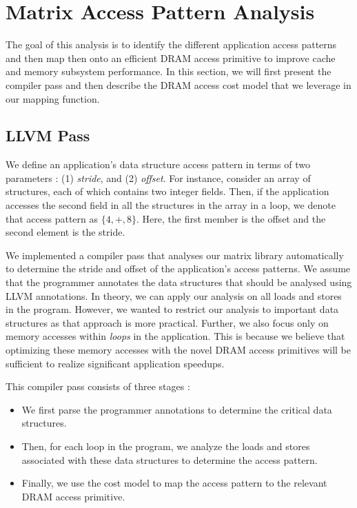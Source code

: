 \documentclass[letterpaper]{article}
\begin{document}
\section{Matrix Access Pattern Analysis}

The goal of this analysis is to identify the different application access
patterns and then map then onto an efficient DRAM access primitive to improve
cache and memory subsystem performance. In this section, we will first present
the compiler pass and then describe the DRAM access cost model that we leverage
in our mapping function.

\subsection{LLVM Pass}

We define an application's data structure access pattern in terms of two 
parameters : (1) \textit{stride}, and (2) \textit{offset}. 
For instance, consider an array of structures, each of which contains two
integer fields. 
Then, if the application accesses the second field in all the structures 
in the array in a loop, we denote that access pattern as $\{4,+,8\}$. 
Here, the first member is the offset and the second element is the stride.

We implemented a compiler pass that analyses our matrix library automatically
to determine the stride and offset of the application's access patterns.
We assume that the programmer annotates the data structures that should
be analysed using LLVM annotations.
In theory, we can apply our analysis on all loads and stores in the program.
However, we wanted to restrict our analysis to important data structures
as that approach is more practical.
Further, we also focus only on memory accesses within \textit{loops} in the 
application. This is because we believe that optimizing these memory accesses
with the novel DRAM access primitives will be sufficient to realize
significant application speedups.

This compiler pass consists of three stages :
\begin{itemize}
  \item{We first parse the programmer annotations to determine the critical data
  structures.}
  \item{Then, for each loop in the program, we analyze the loads and
  stores associated with these data structures to determine the access pattern.}
  \item{Finally, we use the cost model to map the access pattern to the
  relevant DRAM access primitive.}
\end{itemize}
\end{document}
